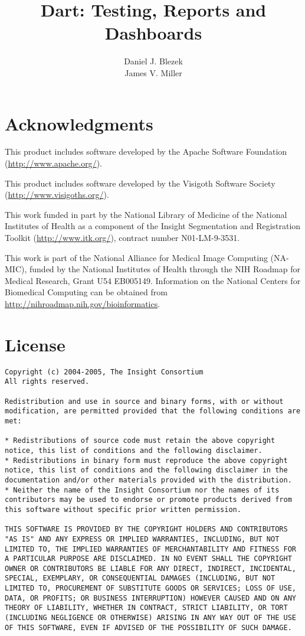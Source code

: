 \documentclass{InsightBook}
\begin{document}
\title{Dart: Testing, Reports and Dashboards}
\author{Daniel J. Blezek \\
James V. Miller}
\maketitle
\chapter*{Acknowledgments}
This product includes software developed by the Apache Software Foundation (\url{http://www.apache.org/}).

This product includes software developed by the Visigoth Software Society (\url{http://www.visigoths.org/}).

This work funded in part by the National Library of Medicine of the National Institutes of Health as a component of the Insight Segmentation and Registration Toolkit (\url{http://www.itk.org/}), contract number N01-LM-9-3531.

This work is part of the National Alliance for Medical Image
Computing (NA-MIC), funded by the National Institutes of Health
through the NIH Roadmap for Medical Research, Grant U54 EB005149.
Information on the National Centers for Biomedical Computing
can be obtained from \url{http://nihroadmap.nih.gov/bioinformatics}.

\chapter*{License}
\begin{verbatim}
Copyright (c) 2004-2005, The Insight Consortium
All rights reserved.

Redistribution and use in source and binary forms, with or without
modification, are permitted provided that the following conditions are
met:

* Redistributions of source code must retain the above copyright
notice, this list of conditions and the following disclaimer.
* Redistributions in binary form must reproduce the above copyright
notice, this list of conditions and the following disclaimer in the
documentation and/or other materials provided with the distribution.
* Neither the name of the Insight Consortium nor the names of its
contributors may be used to endorse or promote products derived from
this software without specific prior written permission.

THIS SOFTWARE IS PROVIDED BY THE COPYRIGHT HOLDERS AND CONTRIBUTORS
"AS IS" AND ANY EXPRESS OR IMPLIED WARRANTIES, INCLUDING, BUT NOT
LIMITED TO, THE IMPLIED WARRANTIES OF MERCHANTABILITY AND FITNESS FOR
A PARTICULAR PURPOSE ARE DISCLAIMED. IN NO EVENT SHALL THE COPYRIGHT
OWNER OR CONTRIBUTORS BE LIABLE FOR ANY DIRECT, INDIRECT, INCIDENTAL,
SPECIAL, EXEMPLARY, OR CONSEQUENTIAL DAMAGES (INCLUDING, BUT NOT
LIMITED TO, PROCUREMENT OF SUBSTITUTE GOODS OR SERVICES; LOSS OF USE,
DATA, OR PROFITS; OR BUSINESS INTERRUPTION) HOWEVER CAUSED AND ON ANY
THEORY OF LIABILITY, WHETHER IN CONTRACT, STRICT LIABILITY, OR TORT
(INCLUDING NEGLIGENCE OR OTHERWISE) ARISING IN ANY WAY OUT OF THE USE
OF THIS SOFTWARE, EVEN IF ADVISED OF THE POSSIBILITY OF SUCH DAMAGE.
\end{verbatim}
\end{document}
